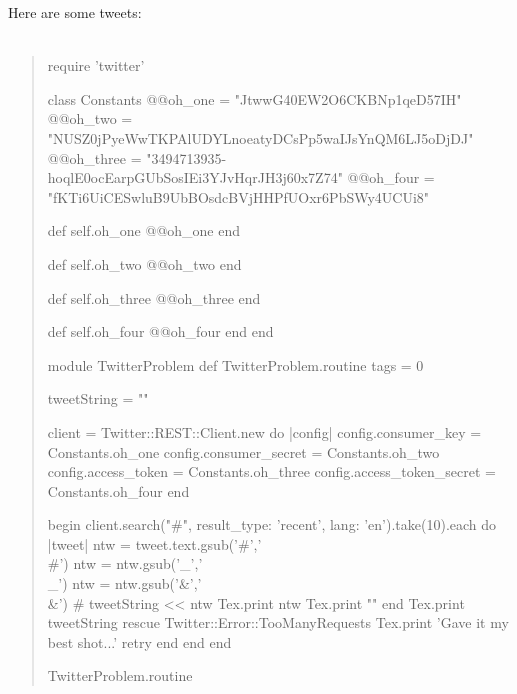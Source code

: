 \documentclass{article}
\begin{document}
Here are some tweets:\\\\
\begin{quote}
\begin{rbtex}
    require 'twitter'

    class Constants
    	@@oh_one = "JtwwG40EW2O6CKBNp1qeD57IH"
    	@@oh_two = "NUSZ0jPyeWwTKPAlUDYLnoeatyDCsPp5waIJsYnQM6LJ5oDjDJ"
    	@@oh_three = "3494713935-hoqlE0ocEarpGUbSosIEi3YJvHqrJH3j60x7Z74"
    	@@oh_four = "fKTi6UiCESwluB9UbBOsdcBVjHHPfUOxr6PbSWy4UCUi8"

    	def self.oh_one
    		@@oh_one
    	end

    	def self.oh_two
    		@@oh_two
    	end

    	def self.oh_three
    		@@oh_three
    	end

    	def self.oh_four
    		@@oh_four
    	end
    end

    module TwitterProblem
    	def TwitterProblem.routine
    		tags = 0

            tweetString = ""

    		client = Twitter::REST::Client.new do |config|
    		  config.consumer_key        = Constants.oh_one
    		  config.consumer_secret     = Constants.oh_two
    		  config.access_token        = Constants.oh_three
    		  config.access_token_secret = Constants.oh_four
    		end

    		begin
    			client.search("#", result_type: 'recent', lang: 'en').take(10).each do |tweet|
                    ntw = tweet.text.gsub('#','\\#')
                    ntw = ntw.gsub('_','\\_')
                    ntw = ntw.gsub('&','\\&')
                    # tweetString << ntw
                    Tex.print ntw
                    Tex.print ""
                end
                Tex.print tweetString
    		rescue Twitter::Error::TooManyRequests
                Tex.print 'Gave it my best shot...'
    			retry
    		end
    	end
    end

    TwitterProblem.routine
\end{rbtex}
\end{quote}
\end{document}
